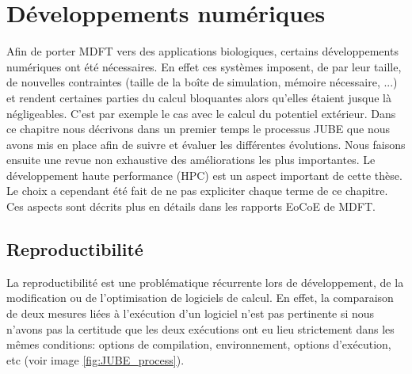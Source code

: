 \chapter{Développements numériques}
\label{chap:numerique}



Afin de porter MDFT vers des applications biologiques, certains développements numériques ont été nécessaires. En effet ces systèmes imposent, de par leur taille, de nouvelles contraintes (taille de la boîte de simulation, mémoire nécessaire, ...) et rendent certaines parties du calcul bloquantes alors qu'elles étaient jusque là négligeables. C'est par exemple le cas avec le calcul du potentiel extérieur. Dans ce chapitre nous décrivons dans un premier temps le processus JUBE que nous avons mis en place afin de suivre et évaluer les différentes évolutions. Nous faisons ensuite une revue non exhaustive des améliorations les plus importantes. Le développement haute performance (HPC) est un aspect important de cette thèse. Le choix a cependant été fait de ne pas expliciter chaque terme de ce chapitre. Ces aspects sont décrits plus en détails dans les rapports EoCoE de MDFT.


\section{Reproductibilité}
La reproductibilité est une problématique récurrente lors de développement, de la modification ou de l'optimisation de logiciels de calcul. En effet, la comparaison de deux mesures liées à l’exécution d'un logiciel n'est pas pertinente si nous n'avons pas la certitude que les deux exécutions ont eu lieu strictement dans les mêmes conditions: options de compilation, environnement, options d’exécution, etc (voir image \ref{fig:JUBE_process}).

